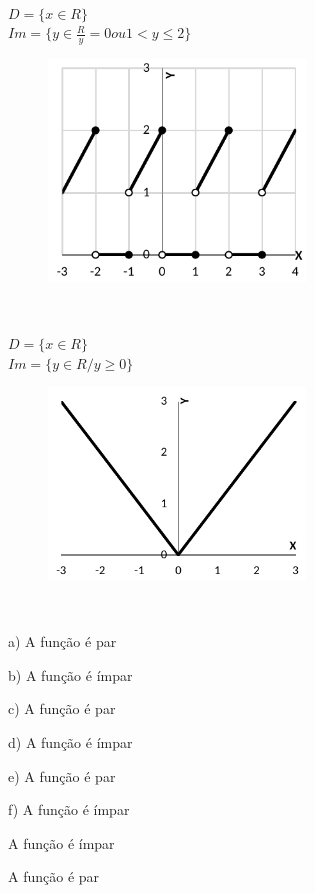 \begin{respostas}{5}
~~

	\ansitem{} \( D= \{ x \in R \}  \) \\ \( Im= \{ y \in \frac{R}{y}=0 ou 1<y \leq 2 \}  \) 

	\begin{figure}[H]
		\begin{Center}
			\includegraphics[width=2.7in,height=2.32in]{capitulos/outras_funcoes/media/image78.pdf}
		\end{Center}
	\end{figure}
~~

	\ansitem{} \( D= \{ x \in R \} \) \\ \( Im= \{ y \in R/y \geq 0 \}  \)

	\begin{figure}[H]
		\begin{Center}
			\includegraphics[width=2.69in,height=2.01in]{capitulos/outras_funcoes/media/image79.pdf}
		\end{Center}
	\end{figure}
\end{respostas}
~~

\begin{respostas}{6}
	\ansitem{} a) A função é par\quad 

	b) A função é ímpar

	c) A função é par

	d) A função é ímpar

	e) A função é par

	f) A função é ímpar

	\ansitem{} A função é ímpar

	\ansitem{} A função é par

\end{respostas}


